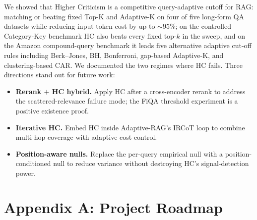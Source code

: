 \documentclass[letterpaper]{article}
\begin{document}
We showed that Higher Criticism is a competitive query-adaptive
cutoff for RAG: matching or beating fixed Top-K and Adaptive-K on
four of five long-form QA datasets while reducing input-token cost
by up to $\sim$95\%; on the controlled Category-Key benchmark HC
also beats every fixed top-$k$ in the sweep, and on the Amazon
compound-query benchmark it leads five alternative adaptive
cut-off rules including Berk--Jones, BH, Bonferroni, gap-based
Adaptive-K, and clustering-based CAR. We documented the two
regimes where HC fails. Three directions stand out for future
work:
\begin{itemize}
\item \textbf{Rerank $+$ HC hybrid.} Apply HC after a cross-encoder
rerank to address the scattered-relevance failure mode; the FiQA
threshold experiment is a positive existence proof.
\item \textbf{Iterative HC.} Embed HC inside Adaptive-RAG's IRCoT
loop to combine multi-hop coverage with adaptive-cost control.
\item \textbf{Position-aware nulls.} Replace the per-query
empirical null with a position-conditioned null to reduce variance
without destroying HC's signal-detection power.
\end{itemize}




\clearpage
\onecolumn
\section*{Appendix A: Project Roadmap}
\end{document}
